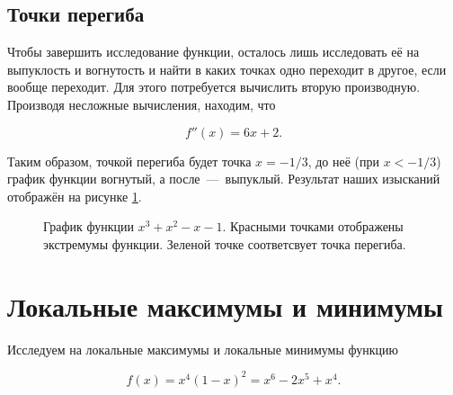 \documentclass[12pt]{article}
\begin{document}
\subsection{Точки перегиба} %
\label{sec:53}
Чтобы завершить исследование функции, осталось лишь исследовать её на выпуклость и вогнутость и найти в каких точках одно переходит в другое, если вообще переходит. Для этого потребуется вычислить вторую производную. Производя несложные вычисления, находим, что 

\begin{equation}
	f''(x) = 6x + 2.
\end{equation}

Таким образом, точкой перегиба будет точка $x = -1/3$, до неё (при $x< -1/3$) график функции вогнутый, а после~\----~выпуклый. Результат наших изысканий отображён на рисунке \ref{fig:73}.

\begin{figure}[htbp]
	\centering
	\caption{График функции $x^3 + x^2 - x -1$. Красными точками отображены экстремумы функции. Зеленой точке соответсвует точка перегиба.}
	\label{fig:73}
\end{figure}

\section{Локальные максимумы и минимумы} %
\label{sec:6}
Исследуем на локальные максимумы и локальные минимумы функцию 

\begin{equation}
	f(x) = x^4(1-x)^2 = x^6-2x^5+x^4.
\end{equation}
\end{document}
